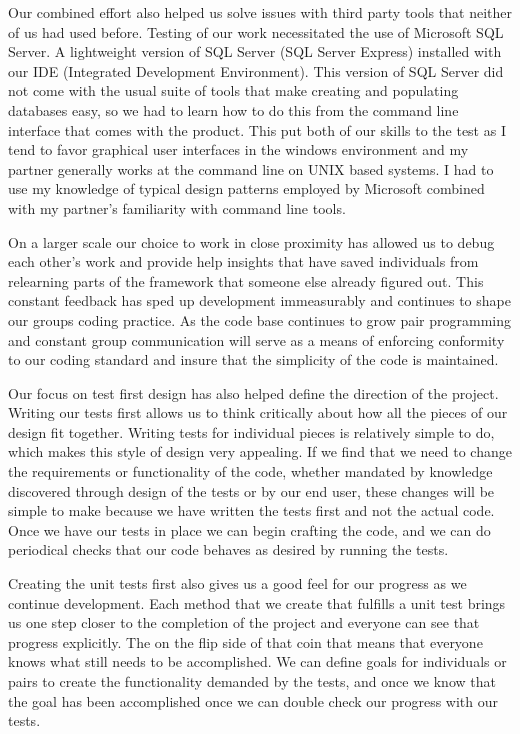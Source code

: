 \documentclass[12pt]{article}
\begin{document}
Our combined effort also helped us solve issues with third party tools that neither of us had used before. Testing of our work necessitated the use of Microsoft SQL Server. A lightweight version of SQL Server (SQL Server Express) installed with our IDE (Integrated Development Environment). This version of SQL Server did not come with the usual suite of tools that make creating and populating databases easy, so we had to learn how to do this from the command line interface that comes with the product. This put both of our skills to the test as I tend to favor graphical user interfaces in the windows environment and my partner generally works at the command line on UNIX based systems. I had to use my knowledge of typical design patterns employed by Microsoft combined with my partner's familiarity with command line tools.

On a larger scale our choice to work in close proximity has allowed us to debug each other's work and provide help insights that have saved individuals from relearning parts of the framework that someone else already figured out. This constant feedback has sped up development immeasurably and continues to shape our groups coding practice. As the code base continues to grow pair programming and constant group communication will serve as a means of enforcing conformity to our coding standard and insure that the simplicity of the code is maintained.

Our focus on test first design has also helped define the direction of the project. Writing our tests first allows us to think critically about how all the pieces of our design fit together. Writing tests for individual pieces is relatively simple to do, which makes this style of design very appealing. If we find that we need to change the requirements or functionality of the code, whether mandated by knowledge discovered through design of the tests or by our end user, these changes will be simple to make because we have written the tests first and not the actual code. Once we have our tests in place we can begin crafting the code, and we can do periodical checks that our code behaves as desired by running the tests.

Creating the unit tests first also gives us a good feel for our progress as we continue development. Each method that we create that fulfills a unit test brings us one step closer to the completion of the project and everyone can see that progress explicitly. The on the flip side of that coin that means that everyone knows what still needs to be accomplished. We can define goals for individuals or pairs to create the functionality demanded by the tests, and once we know that the goal has been accomplished once we can double check our progress with our tests.
\end{document}
